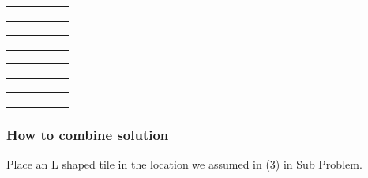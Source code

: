 \documentclass[12pt]{article}
\begin{document}
\begin{table}[!htbp]
\centering
        \begin{tabular}{|M{20pt}|M{20pt}|M{20pt}|M{20pt}|N}
        \hline
         &                          &  &  \\[20pt]\hline
         &  &  &  \\[20pt] \hline
         &                          &  &  \\[20pt] \hline
         &                          &  &  \\[20pt] \hline
        \end{tabular}
        \vspace{2pt}
        \begin{tabular}{|M{20pt}|M{20pt}|M{20pt}|M{20pt}|N}
        \hline
         &                          &  & \\[20pt]\hline
         &                          &  &  \\[20pt] \hline
         &                          &  &  \\[20pt] \hline
          &                          &  &  \\[20pt] \hline
        \end{tabular}

        \begin{tabular}{|M{20pt}|M{20pt}|M{20pt}|M{20pt}|N}
        \hline
         &                          &  &   \\[20pt]\hline
         & &  &  \\[20pt] \hline
         &                          &  &  \\[20pt] \hline
         &                          &  &  \\[20pt] \hline
        \end{tabular}
        \begin{tabular}{|M{20pt}|M{20pt}|M{20pt}|M{20pt}|N}
        \hline
          &                          &  &  \\[20pt]\hline
         &  &  &  \\[20pt] \hline
         &                          &  &  \\[20pt] \hline
         &                          &  &  \\[20pt] \hline
        \end{tabular}
\end{table}
\subsubsection{How to combine solution}
Place an L shaped tile in the location we assumed in (3) in Sub Problem.
\end{document}
